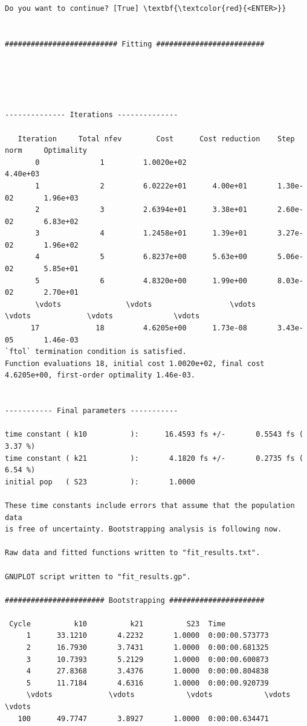 \documentclass[a4paper,11pt,DIV=15,openany]{scrbook}
\begin{document}
\begin{oframed}
\begin{Verbatim}[commandchars=\\\{\}]
Do you want to continue? [True] \textbf{\textcolor{red}{<ENTER>}}


########################## Fitting #########################





-------------- Iterations --------------

   Iteration     Total nfev        Cost      Cost reduction    Step norm     Optimality   
       0              1         1.0020e+02                                    4.40e+03    
       1              2         6.0222e+01      4.00e+01       1.30e-02       1.96e+03    
       2              3         2.6394e+01      3.38e+01       2.60e-02       6.83e+02    
       3              4         1.2458e+01      1.39e+01       3.27e-02       1.96e+02    
       4              5         6.8237e+00      5.63e+00       5.06e-02       5.85e+01    
       5              6         4.8320e+00      1.99e+00       8.03e-02       2.70e+01    
       \vdots               \vdots                  \vdots               \vdots             \vdots              \vdots
      17             18         4.6205e+00      1.73e-08       3.43e-05       1.46e-03    
`ftol` termination condition is satisfied.
Function evaluations 18, initial cost 1.0020e+02, final cost 4.6205e+00, first-order optimality 1.46e-03.


----------- Final parameters -----------

time constant ( k10          ):      16.4593 fs +/-       0.5543 fs (   3.37 %)
time constant ( k21          ):       4.1820 fs +/-       0.2735 fs (   6.54 %)
initial pop   ( S23          ):       1.0000

These time constants include errors that assume that the population data
is free of uncertainty. Bootstrapping analysis is following now.

Raw data and fitted functions written to "fit_results.txt".

GNUPLOT script written to "fit_results.gp".

####################### Bootstrapping ######################

 Cycle          k10          k21          S23  Time
     1      33.1210       4.2232       1.0000  0:00:00.573773
     2      16.7930       3.7431       1.0000  0:00:00.681325
     3      10.7393       5.2129       1.0000  0:00:00.600873
     4      27.8368       3.4376       1.0000  0:00:00.804838
     5      11.7184       4.6316       1.0000  0:00:00.920739
     \vdots             \vdots            \vdots            \vdots                \vdots
   100      49.7747       3.8927       1.0000  0:00:00.634471


\end{Verbatim}
\end{oframed}
\end{document}

